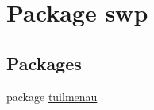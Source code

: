 \hypertarget{namespaceswp}{}\section{Package swp}
\label{namespaceswp}
\subsection*{Packages}
\begin{DoxyCompactItemize}
\item 
package \hyperlink{namespaceswp_1_1tuilmenau}{tuilmenau}
\end{DoxyCompactItemize}
